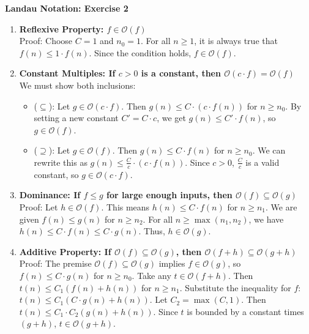\documentclass{article}
\theoremstyle{theorem}
\theoremstyle{definition}
\theoremstyle{remark}
\begin{document}
\textbf{Landau Notation: Exercise 2}
\begin{enumerate}
    \item \textbf{Reflexive Property: $f \in \mathcal{O}(f)$} \\
    Proof: Choose $C = 1$ and $n_0 = 1$. For all $n \geq 1$, it is always true that $f(n) \leq 1 \cdot f(n)$. Since the condition holds, $f \in \mathcal{O}(f)$.

    \item \textbf{Constant Multiples: If $c > 0$ is a constant, then $\mathcal{O}(c \cdot f) = \mathcal{O}(f)$} \\
    We must show both inclusions:
    \begin{itemize}
        \item ($\subseteq$): Let $g \in \mathcal{O}(c \cdot f)$. Then $g(n) \leq C \cdot (c \cdot f(n))$ for $n \geq n_0$. By setting a new constant $C' = C \cdot c$, we get $g(n) \leq C' \cdot f(n)$, so $g \in \mathcal{O}(f)$.
        \item ($\supseteq$): Let $g \in \mathcal{O}(f)$. Then $g(n) \leq C \cdot f(n)$ for $n \geq n_0$. We can rewrite this as $g(n) \leq \frac{C}{c} \cdot (c \cdot f(n))$. Since $c > 0$, $\frac{C}{c}$ is a valid constant, so $g \in \mathcal{O}(c \cdot f)$.
    \end{itemize}

    \item \textbf{Dominance: If $f \leq g$ for large enough inputs, then $\mathcal{O}(f) \subseteq \mathcal{O}(g)$} \\
    Proof: Let $h \in \mathcal{O}(f)$. This means $h(n) \leq C \cdot f(n)$ for $n \geq n_1$. 
    We are given $f(n) \leq g(n)$ for $n \geq n_2$. 
    For all $n \geq \max(n_1, n_2)$, we have $h(n) \leq C \cdot f(n) \leq C \cdot g(n)$. 
    Thus, $h \in \mathcal{O}(g)$.

    \item \textbf{Additive Property: If $\mathcal{O}(f) \subseteq \mathcal{O}(g)$, then $\mathcal{O}(f + h) \subseteq \mathcal{O}(g + h)$} \\
    Proof: The premise $\mathcal{O}(f) \subseteq \mathcal{O}(g)$ implies $f \in \mathcal{O}(g)$, so $f(n) \leq C \cdot g(n)$ for $n \geq n_0$. 
    Take any $t \in \mathcal{O}(f + h)$. Then $t(n) \leq C_1(f(n) + h(n))$ for $n \geq n_1$. 
    Substitute the inequality for $f$: $t(n) \leq C_1(C \cdot g(n) + h(n))$. 
    Let $C_2 = \max(C, 1)$. Then $t(n) \leq C_1 \cdot C_2(g(n) + h(n))$. 
    Since $t$ is bounded by a constant times $(g+h)$, $t \in \mathcal{O}(g + h)$.


\end{enumerate}
\end{document}

